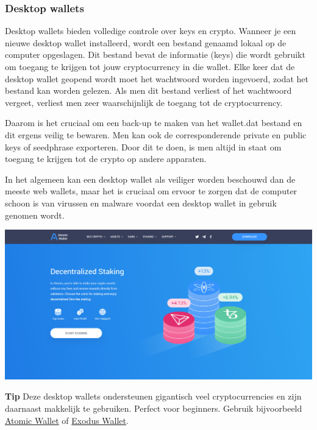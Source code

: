 \subsubsection [Desktop wallets]{Desktop wallets}
Desktop wallets bieden volledige controle over keys en crypto. Wanneer je een nieuwe desktop wallet installeerd, wordt een bestand genaamd  lokaal op de computer opgeslagen. Dit bestand bevat de informatie (keys) die wordt gebruikt om toegang te krijgen tot jouw cryptocurrency in die wallet. Elke keer dat de desktop wallet geopend wordt moet het wachtwoord worden ingevoerd, zodat het bestand  kan worden gelezen. Als men dit bestand verliest of het wachtwoord vergeet, verliest men zeer waarschijnlijk de toegang tot de cryptocurrency. 

Daarom is het cruciaal om een back-up te maken van het wallet.dat bestand en dit ergens veilig te bewaren. Men kan ook de corresponderende private en public keys of seedphrase exporteren. Door dit te doen, is men altijd in staat om toegang te krijgen tot de crypto op andere apparaten.

In het algemeen kan een desktop wallet als veiliger worden beschouwd dan de meeste web wallets, maar het is cruciaal om ervoor te zorgen dat de computer schoon is van virussen en malware voordat een desktop wallet in gebruik genomen wordt.\medskip

\begin{borderbox}
    \centering
    \includegraphics[width=\textwidth]{img/ch-wallets/atomic_wallet1.jpg}
\end{borderbox}
\medskip

\begin{tipbox}{\textbf{Tip}}
 Deze desktop wallets ondersteunen gigantisch veel cryptocurrencies en zijn daarnaast makkelijk te gebruiken. Perfect voor beginners.
\tcblower 
Gebruik bijvoorbeeld \href{https://atomicwallet.io/}{Atomic Wallet} of \href{https://www.exodus.io/}{Exodus Wallet}.
\end{tipbox}\medskip


